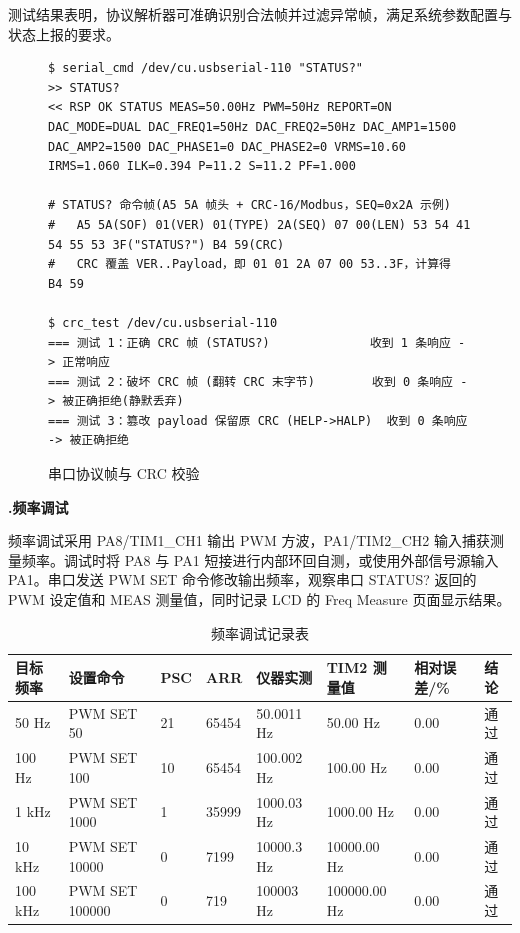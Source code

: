 \documentclass[UTF8,a4paper,zihao=-4,fontset=macnew]{ctexart}
\makeatletter
\def\@extractsubnum#1.#2\@nil{#2}
\newcommand{\subsectiontitle}[2]{%
  \setcounter{subsection}{\numexpr\@extractsubnum#1\@nil-1\relax}\refstepcounter{subsection}%
  \vspace{0.34cm}%
  {\noindent\heiti\bfseries\fontsize{16pt}{18pt}\selectfont #1.\quad #2\par}%
  \vspace{0.54cm}%
}
\makeatother
\begin{document}
测试结果表明，协议解析器可准确识别合法帧并过滤异常帧，满足系统参数配置与状态上报的要求。

\begin{figure}[H]
\centering
\begin{lstlisting}[style=serialterm]
$ serial_cmd /dev/cu.usbserial-110 "STATUS?"
>> STATUS?
<< RSP OK STATUS MEAS=50.00Hz PWM=50Hz REPORT=ON DAC_MODE=DUAL DAC_FREQ1=50Hz DAC_FREQ2=50Hz DAC_AMP1=1500 DAC_AMP2=1500 DAC_PHASE1=0 DAC_PHASE2=0 VRMS=10.60 IRMS=1.060 ILK=0.394 P=11.2 S=11.2 PF=1.000

# STATUS? 命令帧(A5 5A 帧头 + CRC-16/Modbus，SEQ=0x2A 示例)
#   A5 5A(SOF) 01(VER) 01(TYPE) 2A(SEQ) 07 00(LEN) 53 54 41 54 55 53 3F("STATUS?") B4 59(CRC)
#   CRC 覆盖 VER..Payload，即 01 01 2A 07 00 53..3F，计算得 B4 59

$ crc_test /dev/cu.usbserial-110
=== 测试 1：正确 CRC 帧 (STATUS?)              收到 1 条响应 -> 正常响应
=== 测试 2：破坏 CRC 帧 (翻转 CRC 末字节)        收到 0 条响应 -> 被正确拒绝(静默丢弃)
=== 测试 3：篡改 payload 保留原 CRC (HELP->HALP)  收到 0 条响应 -> 被正确拒绝
\end{lstlisting}
\caption{串口协议帧与 CRC 校验}
\label{fig:protocol-hex}
\end{figure}

\subsectiontitle{7.2}{频率调试}
\label{sec:debug-frequency}

频率调试采用 PA8/TIM1\_CH1 输出 PWM 方波，PA1/TIM2\_CH2 输入捕获测量频率。调试时将 PA8 与 PA1 短接进行内部环回自测，或使用外部信号源输入 PA1。串口发送 PWM SET 命令修改输出频率，观察串口 STATUS? 返回的 PWM 设定值和 MEAS 测量值，同时记录 LCD 的 Freq Measure 页面显示结果。

\begin{table}[H]
\centering
{}
\caption{频率调试记录表}
\label{tab:pwm-test}
\begin{tabular}{llllllll}
\toprule
目标频率 & 设置命令 & PSC & ARR & 仪器实测 & TIM2 测量值 & 相对误差/\% & 结论 \\
\midrule
50 Hz & PWM SET 50 & 21 & 65454 & 50.0011 Hz & 50.00 Hz & 0.00 & 通过 \\
100 Hz & PWM SET 100 & 10 & 65454 & 100.002 Hz & 100.00 Hz & 0.00 & 通过 \\
1 kHz & PWM SET 1000 & 1 & 35999 & 1000.03 Hz & 1000.00 Hz & 0.00 & 通过 \\
10 kHz & PWM SET 10000 & 0 & 7199 & 10000.3 Hz & 10000.00 Hz & 0.00 & 通过 \\
100 kHz & PWM SET 100000 & 0 & 719 & 100003 Hz & 100000.00 Hz & 0.00 & 通过 \\
\bottomrule
\end{tabular}
\end{table}
\end{document}
